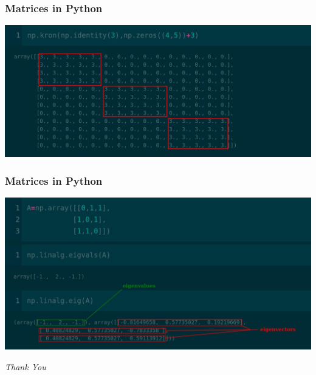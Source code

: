 \documentclass[12pt,aspectratio=169]{beamer}
\begin{document}
\begin{frame}
\frametitle{Matrices in Python}
\begin{center}
\includegraphics[scale=0.3]{mat6}
\end{center}
\end{frame}

\begin{frame}
\frametitle{Matrices in Python}
\begin{center}
\includegraphics[scale=0.3]{mat7}
\end{center}
\end{frame}


\begin{frame}{}
  \centering \Huge
  \emph{Thank You}
\end{frame}
\end{document}
